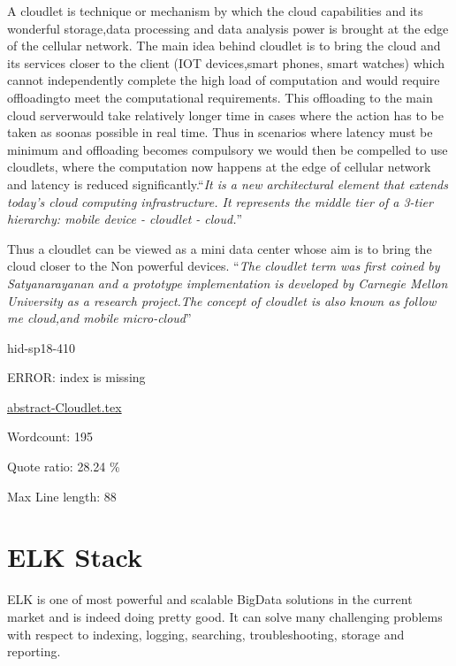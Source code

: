 A cloudlet is technique or mechanism by which the cloud capabilities
and its wonderful storage,data processing and data analysis power is
brought at the edge of the cellular network.  The main idea behind
cloudlet is to bring the cloud and its services closer to the
client (IOT devices,smart phones, smart watches) which cannot
independently complete the high load of computation and would require
offloadingto meet the computational requirements. This offloading to
the main cloud serverwould take relatively longer time in cases where
the action has to be taken as soonas possible in real time. Thus in
scenarios where latency must be minimum and offloading becomes
compulsory we would then be compelled to use cloudlets, where the
computation now happens at the edge of cellular network and latency is
reduced significantly.\color{blue}``\emph{It is a new architectural element that extends
today’s cloud computing infrastructure.  It represents the middle tier
of a 3-tier hierarchy: mobile device - cloudlet -
cloud.}''\color{black}~\cite{hid-sp18-410-wikiCloudlet}

Thus a cloudlet can be viewed as a mini data center whose aim is to
bring the cloud closer to the Non powerful devices. \color{blue}``\emph{The cloudlet
term was first coined by Satyanarayanan and a prototype implementation
is developed by Carnegie Mellon University as a research project.The
concept of cloudlet is also known as follow me cloud,and mobile
micro-cloud}''\color{black}~\cite{hid-sp18-410-wikiCloudlet}


\begin{IU}

hid-sp18-410

ERROR: index is missing

\href{https://github.com/cloudmesh-community/hid-sp18-410/blob/master//technology/abstract-Cloudlet.tex}{abstract-Cloudlet.tex}

 

Wordcount: 195


Quote ratio: 28.24 \%
 
Max Line length: 88
\end{IU}

\section{ELK Stack}

ELK is one of most powerful and scalable BigData solutions in the current
market and is indeed doing pretty good. It can solve many challenging 
problems with respect to indexing, logging, searching, troubleshooting,
storage and reporting.

